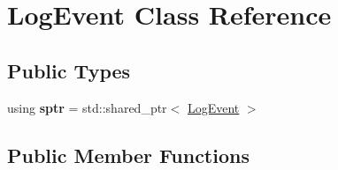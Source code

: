\hypertarget{classLogEvent}{}\section{Log\+Event Class Reference}
\label{classLogEvent}
\subsection*{Public Types}
\begin{DoxyCompactItemize}
\item 
\mbox{\label{classLogEvent_a580d09df4e3c8e1179138d737ff58937}} 
using {\bfseries sptr} = std\+::shared\+\_\+ptr$<$ \hyperlink{classLogEvent}{Log\+Event} $>$
\end{DoxyCompactItemize}
\subsection*{Public Member Functions}
